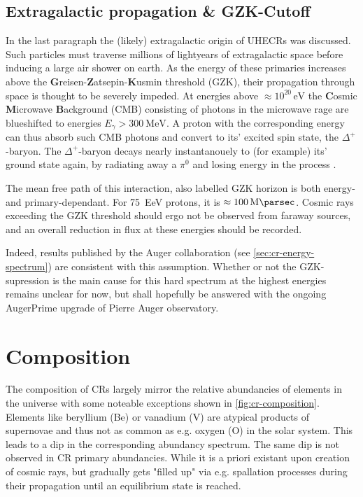 \subsection{Extragalactic propagation \& GZK-Cutoff}
\label{ssec:gzk-cutoff}

In the last paragraph the (likely) extragalactic origin of UHECRs was discussed. Such particles must traverse millions of lightyears of extragalactic space before
inducing a large air shower on earth. As the energy of these primaries increases above the \textbf{G}reisen-\textbf{Z}atsepin-\textbf{K}usmin threshold (GZK),
their propagation through space is thought to be severely impeded. At energies above $\approx10^{20}\,\text{eV}$ the \textbf{C}osmic \textbf{M}icrowave
\textbf{B}ackground (CMB) consisting of photons in the microwave rage are blueshifted to energies $E_\gamma > \SI{300}{\mega\electronvolt}$. A proton with the 
corresponding energy can thus absorb such CMB photons and convert to its' excited spin state, the $\Delta^+$-baryon. The $\Delta^+$-baryon decays nearly 
instantanouely to (for example) its' ground state again, by radiating away a $\pi^0$ \cite{PDG} and losing energy in the process \cite{PDG}. 

The mean free path of this interaction, also labelled GZK horizon is both energy- and primary-dependant. For \SI{75}{\exa\electronvolt} protons, it is 
$\approx \SI{100}{\mega\parsec}$. Cosmic rays exceeding the GZK threshold should ergo not be observed from faraway sources, and an overall reduction in flux 
at these energies should be recorded.

Indeed, results published by the Auger collaboration (see \autoref{sec:cr-energy-spectrum}) are consistent with this assumption. Whether or not the GZK-supression
is the main cause for this hard spectrum at the highest energies remains unclear for now, but shall hopefully be answered with the ongoing AugerPrime upgrade of 
Pierre Auger observatory. 

\section{Composition}
\label{sec:cr-composition}

The composition of CRs largely mirror the relative abundancies of elements in the universe with some noteable exceptions shown in \autoref{fig:cr-composition}.
Elements like beryllium (Be) or vanadium (V) are atypical products of supernovae and thus not as common as e.g. oxygen (O) \cite{gamezo2005three, cowan2004r} in
the solar system. This leads to a dip in the corresponding abundancy spectrum. The same dip is not observed in CR primary abundancies. While it is a priori 
existant upon creation of cosmic rays, but gradually gets "filled up" via e.g. spallation processes during their propagation until an equilibrium state is reached.

